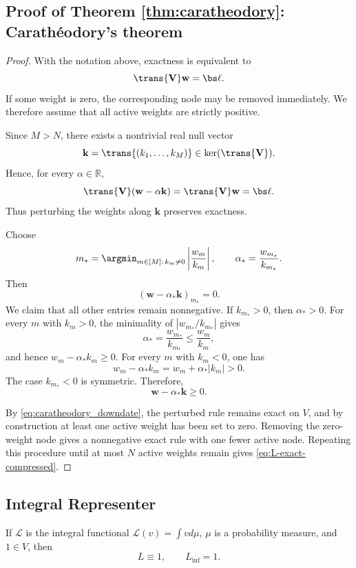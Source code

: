 \documentclass[10pt,dvipsnames]{amsart}
\begin{document}
\subsection{Proof of Theorem \ref{thm:caratheodory}: Carathéodory's theorem}
\label{app:caratheodory}
\positiveCaratheodorySteinitzPruning*
\begin{proof}
With the notation above, exactness is equivalent to
\[
    \trans{\mathbf V}\mathbf w=\bs\ell.
\]
If some weight is zero, the corresponding node may be removed immediately.
We therefore assume that all active weights are strictly positive.

Since \(M>N\), there exists a nontrivial real null vector
\[
    \mathbf k=\trans{(k_1,\ldots,k_M)}\in\ker(\trans{\mathbf V}).
\]
Hence, for every \(\alpha\in\mathbb R\),
\begin{equation}
\label{eq:caratheodory_downdate}
    \trans{\mathbf V}(\mathbf w-\alpha\mathbf k)
    =
    \trans{\mathbf V}\mathbf w
    =
    \bs\ell.
\end{equation}
Thus perturbing the weights along \(\mathbf k\) preserves exactness.

Choose
\begin{equation}
\label{eq:mstar_alphastar}
    m_*=\argmin_{m\in[M]:\,k_m\neq0}
    \left|\frac{w_m}{k_m}\right|,
    \qquad
    \alpha_*=\frac{w_{m_*}}{k_{m_*}}.
\end{equation}
Then
\[
    (\mathbf w-\alpha_*\mathbf k)_{m_*}=0.
\]
We claim that all other entries remain nonnegative.  If \(k_{m_*}>0\), then
\(\alpha_*>0\).  For every \(m\) with \(k_m>0\), the minimality of
\(|w_{m_*}/k_{m_*}|\) gives
\[
    \alpha_*=\frac{w_{m_*}}{k_{m_*}}
    \le
    \frac{w_m}{k_m},
\]
and hence \(w_m-\alpha_*k_m\ge0\).  For every \(m\) with \(k_m<0\), one has
\[
    w_m-\alpha_*k_m
    =
    w_m+\alpha_*|k_m|
    >
    0.
\]
The case \(k_{m_*}<0\) is symmetric.  Therefore,
\[
    \mathbf w-\alpha_*\mathbf k\ge0.
\]

By \eqref{eq:caratheodory_downdate}, the perturbed rule remains exact on
\(V\), and by construction at least one active weight has been set to zero.
Removing the zero-weight node gives a nonnegative exact rule with one fewer
active node.  Repeating this procedure until at most \(N\) active weights
remain gives \eqref{eq:L-exact-compressed}.
\end{proof}

\subsection{Integral Representer}
\label{app:integral-representer}
\begin{lemma}
\label{lem:integral-representer}
If \(\mathcal L\) is the integral functional $\mathcal L(v) = \int v d \mu $,
\(\mu\) is a probability measure, and \(1\in V\), then
\[
    L\equiv 1,
    \qquad
    L_{\inf}=1.
\]
\end{lemma}
\end{document}
